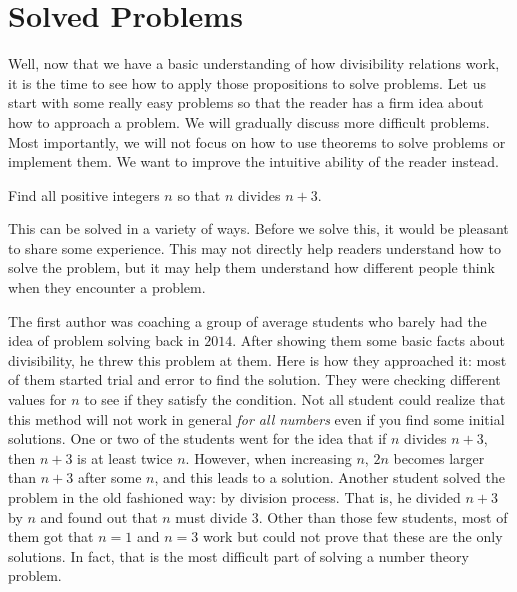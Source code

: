 \documentclass{subfile}
\begin{document}
\section{Solved Problems}
	Well, now that we have a basic understanding of how divisibility relations work, it is the time to see how to apply those propositions to solve problems. Let us start with some really easy problems so that the reader has a firm idea about how to approach a problem. We will gradually discuss more difficult problems. Most importantly, we will not focus on how to use theorems to solve problems or implement them. We want to improve the intuitive ability of the reader instead.
		\begin{problem}
			Find all positive integers $n$ so that $n$ divides $n+3$.
		\end{problem}
	This can be solved in a variety of ways. Before we solve this, it would be pleasant to share some experience. This may not directly help readers understand how to solve the problem, but it may help them understand how different people think when they encounter a problem.

	The first author was coaching a group of average students who barely had the idea of problem solving back in $2014$. After showing them some basic facts about divisibility, he threw this problem at them. Here is how they approached it: most of them started trial and error to find the solution. They were checking different values for $n$ to see if they satisfy the condition. Not all student could realize that this method will not work in general \textit{for all numbers} even if you find some initial solutions. One or two of the students went for the idea that if $n$ divides $n+3$, then $n+3$ is at least twice $n$. However, when increasing $n$, $2n$ becomes larger than $n+3$ after some $n$, and this leads to a solution. Another student solved the problem in the old fashioned way: by division process. That is, he divided $n+3$ by $n$ and found out that $n$ must divide $3$. Other than those few students, most of them got that $n=1$ and $n=3$ work but could not prove that these are the only solutions. In fact, that is the most difficult part of solving a number theory problem.
\end{document}
